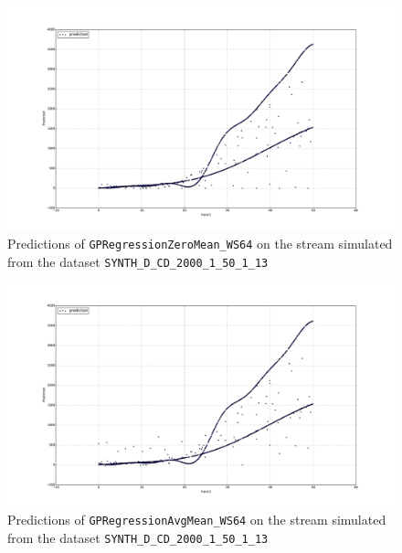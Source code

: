 \begin{figure}[htbp]
  \centering
    \includegraphics[width=\linewidth]{./Figures/gpreg_zeromean_ws64_approximated_func_SYNTH_D_CD_2000_1_50_1_13.pdf}
  \caption{Predictions of \texttt{GPRegressionZeroMean\_WS64} on the stream simulated from the dataset \texttt{SYNTH\_D\_CD\_2000\_1\_50\_1\_13}}
  \label{fig:gpreg_zeromean_ws64_approximated_func_SYNTH_D_CD_2000_1_50_1_13}
\end{figure}

\begin{figure}[htbp]
  \centering
    \includegraphics[width=\linewidth]{./Figures/gpreg_avgmean_ws64_approximated_func_SYNTH_D_CD_2000_1_50_1_13.pdf}
  \caption{Predictions of \texttt{GPRegressionAvgMean\_WS64} on the stream simulated from the dataset \texttt{SYNTH\_D\_CD\_2000\_1\_50\_1\_13}}
  \label{fig:gpreg_avgmean_ws64_approximated_func_SYNTH_D_CD_2000_1_50_1_13}
\end{figure}

